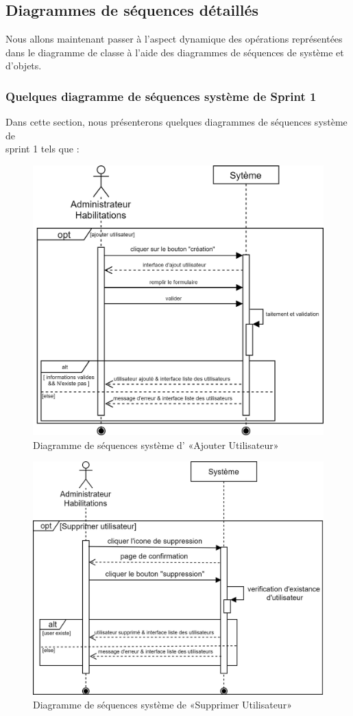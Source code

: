 \subsection{Diagrammes de séquences détaillés}
Nous allons maintenant passer à l’aspect dynamique des opérations représentées dans le diagramme de classe à l’aide des diagrammes de séquences de système et d’objets.
\subsubsection{Quelques diagramme de séquences système de Sprint 1}
Dans cette section, nous présenterons quelques diagrammes de séquences système de \\sprint 1 tels que : \newpage
{}
\begin{figure}[H]
	\centering
	\includegraphics[width=0.65\linewidth]{img/conception/sequences/add-user}
	\caption[Diagramme de séquences système d’ «Ajouter Utilisateur»]{Diagramme de séquences système d’ «Ajouter Utilisateur»}
	\label{fig:add-user}
\end{figure}

\begin{figure}[H]
	\centering
	\includegraphics[width=0.65\linewidth]{img/conception/sequences/delete-user}
	\caption[Diagramme de séquences système de «Supprimer Utilisateur»]{Diagramme de séquences système de «Supprimer Utilisateur»}
	\label{fig:delete-user}
\end{figure}

